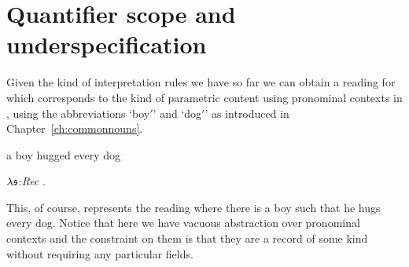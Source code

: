 \section{Quantifier scope and underspecification}

Given the kind of interpretation rules we have so far we can obtain a
reading for  which corresponds to the kind of parametric
content using pronominal contexts
in , using the abbreviations `boy$'$' and `dog$'$' as
introduced in Chapter~\ref{ch:commonnouns}.
\begin{ex} 
\begin{subex} 
 
\item a boy hugged every dog 
 
\item $\lambda \frak{s}$:\textit{Rec} . 
 
\end{subex} 
   
\end{ex} 
This, of course, represents the reading where there is a boy such that
he hugs every dog.  Notice that here we have vacuous abstraction over
pronominal contexts and the constraint on them is that they are a record of
some kind without requiring any particular fields.    

